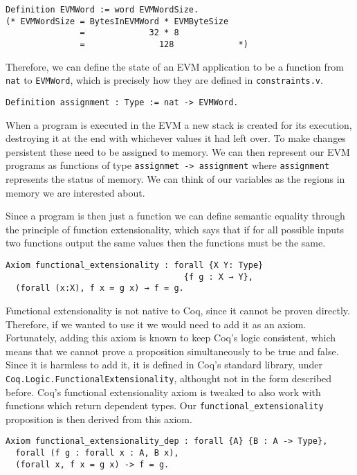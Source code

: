 \begin{verbatim}
Definition EVMWord := word EVMWordSize. 
(* EVMWordSize = BytesInEVMWord * EVMByteSize
               =             32 * 8
               =               128             *)
\end{verbatim}

Therefore, we can define the state of an EVM application to be a function from \texttt{nat} 
to \texttt{EVMWord}, which is precisely how they are defined in \verb|constraints.v|.

\begin{verbatim}
Definition assignment : Type := nat -> EVMWord.
\end{verbatim}

When a program is executed in the EVM a new stack is created for its execution, destroying it at the
end with whichever values it had left over. To make changes persistent these need to be assigned to
memory. We can then represent our EVM programs as functions of type
\texttt{assignmet -> assignment} where \texttt{assignment} represents the status of
memory. We can think of our variables as the regions in memory we are interested about.

Since a program is then just a function we can define semantic equality through the principle of
function extensionality, which says that if for all possible inputs two functions output the same
values then the functions must be the same.

\begin{verbatim}
Axiom functional_extensionality : forall {X Y: Type}
                                    {f g : X → Y},
  (forall (x:X), f x = g x) → f = g.
\end{verbatim}

Functional extensionality is not native to Coq, since it cannot be proven directly. Therefore, if we
wanted to use it we would need to add it as an axiom. Fortunately, adding this axiom is known to keep
Coq's logic consistent, which means that we cannot prove a proposition simultaneously to be true and 
false. Since it is harmless to add it, it is defined in Coq's standard library, under 
\texttt{Coq.Logic.FunctionalExtensionality}, althought not in the form described before. Coq's functional
extensionality axiom is tweaked to also work with functions which return dependent types. Our 
\texttt{functional_extensionality} proposition is then derived from this axiom.

\begin{verbatim}
Axiom functional_extensionality_dep : forall {A} {B : A -> Type},
  forall (f g : forall x : A, B x),
  (forall x, f x = g x) -> f = g.
\end{verbatim}

